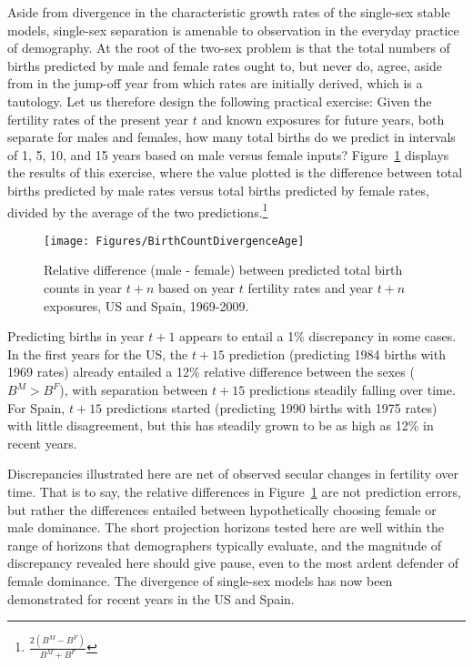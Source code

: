  \FloatBarrier
\label{sec:divbirth}
Aside from divergence in the characteristic growth rates of the single-sex
stable models, single-sex separation is amenable to observation in the everyday
practice of demography. At the root of the two-sex problem is that the total
numbers of births predicted by male and female rates ought to, but never do,
agree, aside from in the jump-off year from which rates are initially derived, 
which is a tautology. Let us therefore design the following practical exercise:
Given the fertility rates of the present year $t$ and known exposures for
future years, both separate for males and females, how many total births do we
predict in intervals of 1, 5, 10, and 15 years based on male
versus female inputs? Figure~\ref{fig:BirthCountDivergenceAge} displays the
results of this exercise, where the value plotted is the
difference between total births predicted by male
rates versus total births predicted by female rates, divided by
the average of the two predictions.\footnote{$\frac{2(B^M - B^F)}{B^M + B^F}$}

\begin{figure}[ht!]
        \centering  
          \caption{Relative difference (male - female) between predicted total
          birth counts in year $t+n$ based on year $t$ fertility rates and year $t+n$ exposures, US and Spain, 1969-2009.}
           \texttt{[image: Figures/BirthCountDivergenceAge]}
          \label{fig:BirthCountDivergenceAge}
\end{figure}

Predicting births in year $t+1$ appears to entail a 1\% discrepancy in some
cases. In the first years for the US, the $t+15$ prediction (predicting
1984 births with 1969 rates) already entailed a 12\% relative difference
between the sexes ($B^M > B^F$), with separation between $t+15$ predictions
steadily falling over time. For Spain, $t+15$ predictions started (predicting 1990
births with 1975 rates) with little disagreement, but this has steadily grown to be as high
as 12\% in recent years.

Discrepancies illustrated here are net of observed secular changes in
fertility over time. That is to say, the relative differences in
Figure~\ref{fig:BirthCountDivergenceAge} are not prediction errors, but rather
the differences entailed between hypothetically choosing female or male
dominance. The short projection horizons tested here are well within the range
of horizons that demographers typically evaluate, and the magnitude of
discrepancy revealed here should give pause, even to the most ardent defender
of female dominance. The divergence of single-sex
models has now been demonstrated for recent years in the US and Spain.

